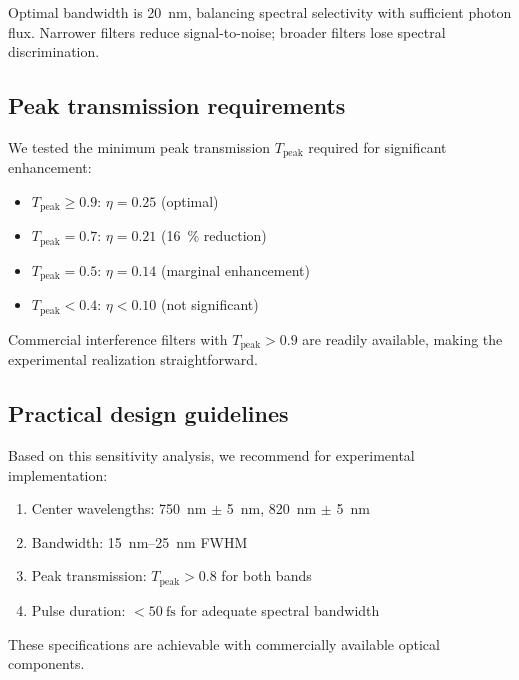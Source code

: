 \documentclass[11pt,a4paper]{article}
\begin{document}
Optimal bandwidth is \SI{20}{\nano\meter}, balancing spectral selectivity with sufficient photon flux. Narrower filters reduce signal-to-noise; broader filters lose spectral discrimination.

\subsection{Peak transmission requirements}

We tested the minimum peak transmission $T_{\mathrm{peak}}$ required for significant enhancement:

\begin{itemize}
    \item $T_{\mathrm{peak}} \geq 0.9$: $\eta = 0.25$ (optimal)
    \item $T_{\mathrm{peak}} = 0.7$: $\eta = 0.21$ (\SI{16}{\percent} reduction)
    \item $T_{\mathrm{peak}} = 0.5$: $\eta = 0.14$ (marginal enhancement)
    \item $T_{\mathrm{peak}} < 0.4$: $\eta < 0.10$ (not significant)
\end{itemize}

Commercial interference filters with $T_{\mathrm{peak}} > 0.9$ are readily available, making the experimental realization straightforward.

\subsection{Practical design guidelines}

Based on this sensitivity analysis, we recommend for experimental implementation:
\begin{enumerate}
    \item Center wavelengths: \SI{750}{\nano\meter} $\pm$ \SI{5}{\nano\meter}, \SI{820}{\nano\meter} $\pm$ \SI{5}{\nano\meter}
    \item Bandwidth: \SIrange{15}{25}{\nano\meter} FWHM
    \item Peak transmission: $T_{\mathrm{peak}} > 0.8$ for both bands
    \item Pulse duration: $< \SI{50}{\femto\second}$ for adequate spectral bandwidth
\end{enumerate}

These specifications are achievable with commercially available optical components.

\end{document}
